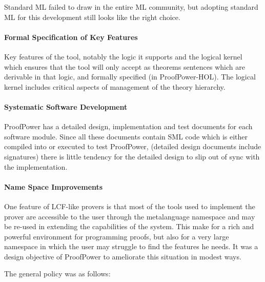 \documentclass[10pt,titlepage]{book}
\def\Product{ProofPower}
\begin{document}
Standard ML failed to draw in the entire ML community, but adopting standard ML for this development still looks like the right choice.

\paragraph{Formal Specification of Key Features}

Key features of the tool, notably the logic it supports and the logical kernel which ensures that the tool will only accept as theorems sentences which are derivable in that logic, and formally specified (in \Product-HOL).
The logical kernel includes critical aspects of management of the theory hierarchy.

\paragraph{Systematic Software Development}

{\Product} has a detailed design, implementation and test documents for each software module.
Since all these documents contain SML code which is either compiled into or executed to test {\Product}, (detailed design documents include signatures) there is little tendency for the detailed design to slip out of sync with the implementation.

\paragraph{Name Space Improvements}

One feature of LCF-like provers is that most of the tools used to implement the prover are accessible to the user through the metalanguage namespace and may be re-used in extending the capabilities of the system.
This make for a rich and powerful environment for programming proofs, but also for a very large namespace in which the user may struggle to find the features he needs.
It was a design objective of {\Product} to ameliorate this situation in modest ways.

The general policy was as follows:
\end{document}

